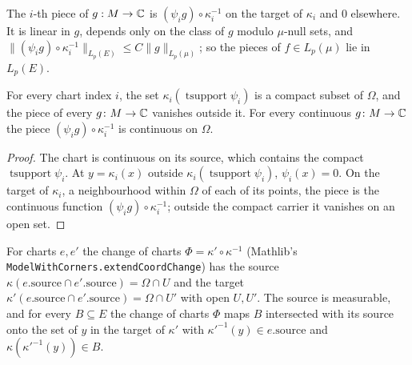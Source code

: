 \begin{definition}
\label{def:chart-pieces}
\leanok
{}
The $i$-th piece of $g : M \to \mathbb{C}$ is $(\psi_i g) \circ \kappa_i^{-1}$ on the target of
$\kappa_i$ and $0$ elsewhere. It is linear in $g$, depends only on the class of $g$ modulo
$\mu$-null sets, and $\|(\psi_i g) \circ \kappa_i^{-1}\|_{L_p(E)} \leq C \|g\|_{L_p(\mu)}$; so the
pieces of $f \in L_p(\mu)$ lie in $L_p(E)$.
\end{definition}

\begin{lemma}
\label{lem:piece-carrier}
\leanok
{}
For every chart index $i$, the set $\kappa_i(\operatorname{tsupport} \psi_i)$ is a compact subset
of $\Omega$, and the piece of every $g \colon M \to \mathbb{C}$ vanishes outside it. For every continuous
$g \colon M \to \mathbb{C}$ the piece $(\psi_i g) \circ \kappa_i^{-1}$ is continuous on $\Omega$.
\end{lemma}

\begin{proof}
\leanok
The chart is continuous on its source, which contains the compact
$\operatorname{tsupport} \psi_i$. At $y = \kappa_i(x)$ outside
$\kappa_i(\operatorname{tsupport} \psi_i)$, $\psi_i(x) = 0$. On the target of $\kappa_i$, a
neighbourhood within $\Omega$ of each of its points, the piece is the continuous function
$(\psi_i g) \circ \kappa_i^{-1}$; outside the compact carrier it vanishes on an open set.
\end{proof}

\begin{lemma}
\label{lem:coord-change}
\leanok
For charts $e, e'$ the change of charts $\Phi = \kappa' \circ \kappa^{-1}$ (Mathlib's
\texttt{ModelWithCorners.extendCoordChange}) has the source $\kappa(e.\mathrm{source} \cap
e'.\mathrm{source}) = \Omega \cap U$ and the target
$\kappa'(e.\mathrm{source} \cap e'.\mathrm{source}) = \Omega \cap U'$ with open $U, U'$. The
source is measurable, and for every $B \subseteq E$ the change of charts $\Phi$ maps $B$ intersected
with its source onto the set of $y$ in the target of $\kappa'$ with
$\kappa'^{-1}(y) \in e.\mathrm{source}$ and $\kappa(\kappa'^{-1}(y)) \in B$.
\end{lemma}

